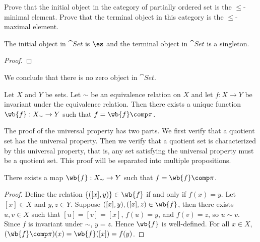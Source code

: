 \documentclass[10pt]{article}
\begin{document}
\begin{problem}
    Prove that the initial object in the category of partially ordered set is the $\le$-minimal element. Prove that the terminal object in this category is the $\le$-maximal element.
\end{problem}
\begin{proposition}
    The initial object in $\cat{Set}$ is $\es$ and the terminal object in $\cat{Set}$ is a singleton.
\end{proposition}
\begin{proof}
    
\end{proof}
\par
We conclude that there is no zero object in $\cat{Set}$.
\begin{Universal property for quotient sets}
    Let $X$ and $Y$ be sets. Let $\sim$ be an equivalence relation on $X$ and let $f:X\to Y$ be invariant under the equivalence relation. Then there exists a unique function $\wb{f}:{X}_{\sim}\to Y$ such that $f=\wb{f}\comp\pi$.
\end{Universal property for quotient sets}
\begin{center}
\end{center}
\par
The proof of the universal property has two parts. We first verify that a quotient set has the universal property. Then we verify that a quotient set is characterized by this universal property, that is, any set satisfying the universal property must be a quotient set. This proof will be separated into multiple propositions.
\begin{proposition}
    There exists a map $\wb{f}:{X}_{\sim}\to Y$ such that $f=\wb{f}\comp\pi$.
\end{proposition}
\begin{proof}
    Define the relation $\{([x],y)\}\in\wb{f}$ if and only if $f(x)=y$. Let $[x]\in X$ and $y,z\in Y$. Suppose $([x],y),([x],z)\in\wb{f}$, then there exists $u,v\in X$ such that $[u]=[v]=[x]$, $f(u)=y$, and $f(v)=z$, so $u\sim v$. Since $f$ is invariant under $\sim$, $y=z$. Hence $\wb{f}$ is well-defined. For all $x\in X$, $(\wb{f}\comp\pi)(x)=\wb{f}([x])=f(y)$.
\end{proof}
\end{document}
